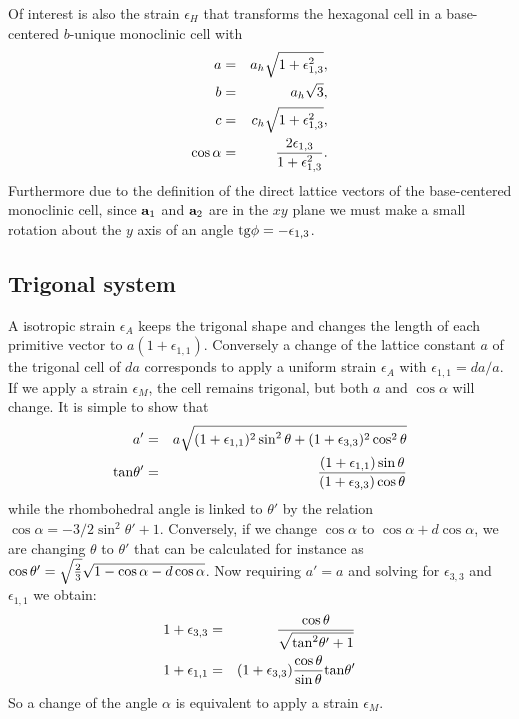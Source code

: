 \documentclass[12pt,a4paper]{article}
\begin{document}
Of interest is also the strain $\epsilon_H$ that transforms the hexagonal
cell in a base-centered $b$-unique monoclinic cell with
\begin{eqnarray}
a&=&a_h \sqrt{1 + \epsilon_{1,3}^2}, \\
b&=&a_h \sqrt{3}, \\
c&=&c_h \sqrt{1 + \epsilon_{1,3}^2}, \\
\cos\alpha &=& {2 \epsilon_{1,3} \over 1+\epsilon_{1,3}^2}.
\end{eqnarray}
Furthermore due to the definition of the direct lattice vectors of the 
base-centered monoclinic cell, since ${\bf a}_1$ and ${\bf a}_2$ are 
in the $xy$ plane we must make a small rotation about the $y$ axis of an angle 
${\rm tg} \phi = - \epsilon_{1,3}$.

\subsection{\color{web-blue}Trigonal system}
A isotropic strain $\epsilon_A$ keeps the trigonal shape and
changes the length of each primitive vector to
$a(1+\epsilon_{1,1})$. Conversely a change of the lattice constant
$a$ of the trigonal cell of $da$ corresponds to apply a uniform strain
$\epsilon_A$ with $\epsilon_{1,1}=da/a$.
If we apply a strain $\epsilon_M$, the cell remains trigonal, but both $a$ 
and $\cos\alpha$ will change.
It is simple to show that 
\begin{eqnarray}
a'&=&a \sqrt{(1+\epsilon_{1,1})^2 \sin^2\theta+
(1+\epsilon_{3,3})^2\cos^2\theta}  \\
{\rm tan} \theta'&=& {(1+\epsilon_{1,1}) \sin \theta \over
(1+\epsilon_{3,3}) \cos \theta}
\end{eqnarray}
while the rhombohedral angle is linked to $\theta'$ by the relation
$\cos\alpha=-3/2 \sin^2 \theta'+1$. Conversely, if we change $\cos \alpha$
to $\cos\alpha+d \cos\alpha$, we are changing $\theta$ to $\theta'$ that
can be calculated for instance as $\cos \theta'=\sqrt{2\over 3} 
\sqrt{1-\cos\alpha-d\cos\alpha}$. Now requiring $a'=a$ and solving
for $\epsilon_{3,3}$ and $\epsilon_{1,1}$ we obtain:
\begin{eqnarray}
1+\epsilon_{3,3} &=& {\cos\theta \over \sqrt{{\rm tan}^2 \theta'+1}} \\
1+\epsilon_{1,1} &=& (1+\epsilon_{3,3}){\cos\theta \over \sin\theta} 
{\rm tan} \theta' 
\end{eqnarray}
So a change of the angle $\alpha$ is equivalent to apply a strain
$\epsilon_M$.
 
\end{document}
